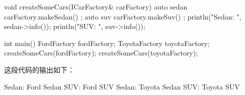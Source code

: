 \begin{cpp}
void createSomeCars(ICarFactory& carFactory)
{
    auto sedan { carFactory.makeSedan() };
    auto suv { carFactory.makeSuv() };
    println("Sedan: {}", sedan->info());
    println("SUV: {}", suv->info());
}

int main()
{
    FordFactory fordFactory;
    ToyotaFactory toyotaFactory;
    createSomeCars(fordFactory);
    createSomeCars(toyotaFactory);
}
\end{cpp}

这段代码的输出如下：

\begin{shell}
Sedan: Ford Sedan
SUV: Ford SUV
Sedan: Toyota Sedan
SUV: Toyota SUV
\end{shell}















